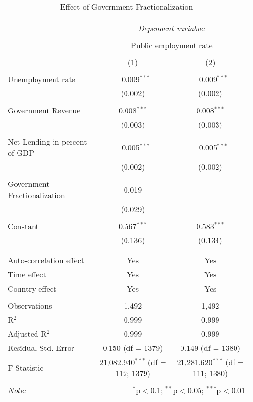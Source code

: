 
\begin{table}[!htbp] \centering 
  \caption{Effect of Government Fractionalization} 
  \label{} 
\begin{tabular}{@{\extracolsep{5pt}}lcc} 
\\[-1.8ex]\hline 
\hline \\[-1.8ex] 
 & \multicolumn{2}{c}{\textit{Dependent variable:}} \\ 
\cline{2-3} 
\\[-1.8ex] & \multicolumn{2}{c}{Public employment rate} \\ 
\\[-1.8ex] & (1) & (2)\\ 
\hline \\[-1.8ex] 
 Unemployment rate & $-$0.009$^{***}$ & $-$0.009$^{***}$ \\ 
  & (0.002) & (0.002) \\ 
  & & \\ 
 Government Revenue & 0.008$^{***}$ & 0.008$^{***}$ \\ 
  & (0.003) & (0.003) \\ 
  & & \\ 
 Net Lending in percent of GDP & $-$0.005$^{***}$ & $-$0.005$^{***}$ \\ 
  & (0.002) & (0.002) \\ 
  & & \\ 
 Government Fractionalization & 0.019 &  \\ 
  & (0.029) &  \\ 
  & & \\ 
 Constant & 0.567$^{***}$ & 0.583$^{***}$ \\ 
  & (0.136) & (0.134) \\ 
  & & \\ 
\hline \\[-1.8ex] 
Auto-correlation effect & Yes & Yes \\ 
Time effect & Yes & Yes \\ 
Country effect & Yes & Yes \\ 
\hline \\[-1.8ex] 
Observations & 1,492 & 1,492 \\ 
R$^{2}$ & 0.999 & 0.999 \\ 
Adjusted R$^{2}$ & 0.999 & 0.999 \\ 
Residual Std. Error & 0.150 (df = 1379) & 0.149 (df = 1380) \\ 
F Statistic & 21,082.940$^{***}$ (df = 112; 1379) & 21,281.620$^{***}$ (df = 111; 1380) \\ 
\hline 
\hline \\[-1.8ex] 
\textit{Note:}  & \multicolumn{2}{r}{$^{*}$p$<$0.1; $^{**}$p$<$0.05; $^{***}$p$<$0.01} \\ 
\end{tabular} 
\end{table} 
